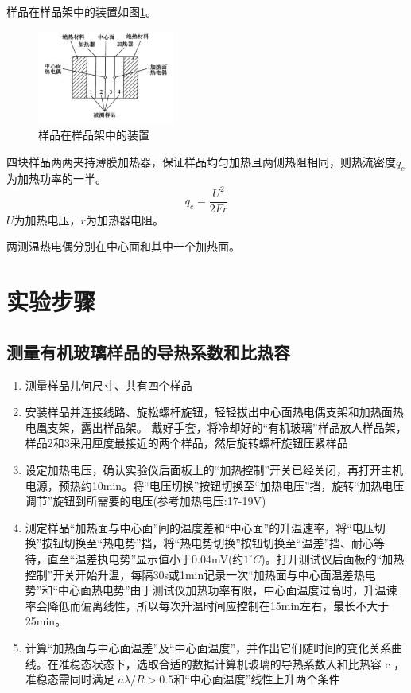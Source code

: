 \documentclass[10pt,a4paper,twocolumn,twoside,UTF8]{ctexart}
\begin{document}
	样品在样品架中的装置如图\ref{fig:illus-4}。
	\begin{figure}[!h]
        \centering
        \includegraphics[width=0.4\textwidth]{img//5.jpg}
        \caption{样品在样品架中的装置}
        \label{fig:illus-4}
    \end{figure}
	四块样品两两夹持薄膜加热器，保证样品均匀加热且两侧热阻相同，则热流密度$q_c$为加热功率的一半。
	\begin{equation}
		q_c = \frac{U^2}{2Fr}
	\end{equation}
	$U$为加热电压，$r$为加热器电阻。
	
	两测温热电偶分别在中心面和其中一个加热面。


	\section{实验步骤}
	\subsection{测量有机玻璃样品的导热系数和比热容}
	\begin{enumerate}
		\item 测量样品儿何尺寸、共有四个样品
		\item 安装样品并连接线路、旋松螺杆旋钮，轻轻拔出中心面热电偶支架和加热面热电凰支架，露出样品架。
		戴好手套，将冷却好的“有机玻璃”样品放人样品架，样品2和3采用厘度最接近的两个样品，然后旋转螺杆旋钮压紧样品
		\item 设定加热电压，确认实验仪后面板上的“加热控制”开关已经关闭，再打开主机电源，预热约10min。将“电压切换”按钮切换至“加热电压”挡，旋转“加热电压调节”旋钮到所需要的电压(参考加热电压:17-19V)
		\item 测定样品“加热面与中心面”间的温度差和“中心面”的升温速率，将“电压切换”按钮切换至“热电势”挡，将“热电势切换”按钮切换至“温差”挡、耐心等待，直至“温差执电势”显示值小于0.04mV(约$1^{\circ }C$)。打开测试仪后面板的“加热控制”开关开始升温，每隔30s或1min记录一次“加热面与中心面温差热电势”和“中心面热电势”由于测试仪加热功率有限，中心面温度过高时，升温谏率会降低而偏离线性，所以每次升温时间应控制在15min左右，最长不大于25min。
		\item 计算“加热面与中心面温差”及“中心面温度”，并作出它们随时间的变化关系曲线。在准稳态状态下，选取合适的数据计算机玻璃的导热系数入和比热容 c ，准稳态需同时满足 $a\lambda / R >0.5$和“中心面温度”线性上升两个条件
	\end{enumerate}
\end{document}
